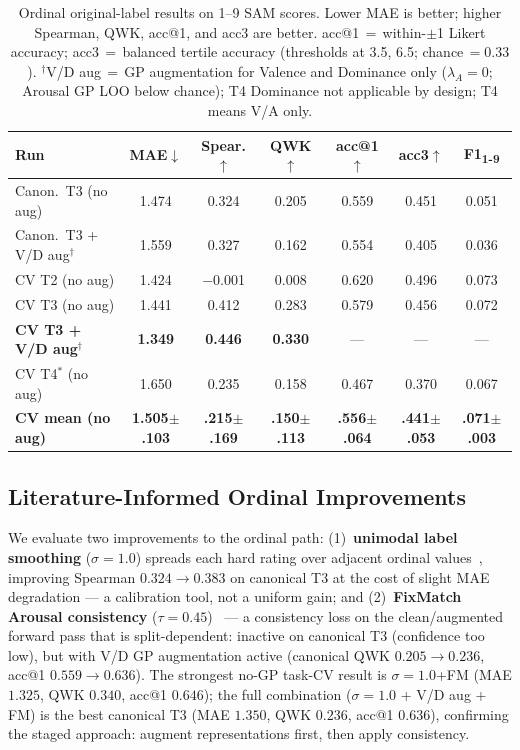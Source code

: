 \documentclass[sigconf,nonacm]{acmart}
\begin{document}
\begin{table}[t]
\caption{Ordinal original-label results on 1--9 SAM scores.  Lower MAE is
better; higher Spearman, QWK, acc@1, and acc3 are better.
acc@1\,$=$\,within-$\pm$1 Likert accuracy; acc3\,$=$\,balanced tertile accuracy
(thresholds at 3.5, 6.5; chance\,$=0.33$).
$^\dagger$V/D aug\,$=$\,GP augmentation for Valence and Dominance only
($\lambda_A{=}0$; Arousal GP LOO below chance);
T4 Dominance not applicable by design; T4 means V/A only.}
\label{tab:ordinal}
\centering
\setlength{\tabcolsep}{6pt}
\small
\begin{tabular}{lcccccc}
\toprule
\textbf{Run} & \textbf{MAE}$\downarrow$ & \textbf{Spear.}$\uparrow$ &
\textbf{QWK}$\uparrow$ & \textbf{acc@1}$\uparrow$ & \textbf{acc3}$\uparrow$ &
\textbf{F1\textsubscript{1-9}} \\
\midrule
Canon.\ T3 (no aug) & 1.474 & 0.324 & 0.205 & 0.559 & 0.451 & 0.051 \\
Canon.\ T3 + V/D aug$^\dagger$ & 1.559 & 0.327 & 0.162 & 0.554 & 0.405 & 0.036 \\
\midrule
CV T2 (no aug)   & 1.424 & $-$0.001 & 0.008 & 0.620 & 0.496 & 0.073 \\
CV T3 (no aug)   & 1.441 & 0.412  & 0.283 & 0.579 & 0.456 & 0.072 \\
\textbf{CV T3 + V/D aug}$^\dagger$ & \textbf{1.349} & \textbf{0.446} & \textbf{0.330} & --- & --- & --- \\
CV T4$^*$ (no aug) & 1.650 & 0.235 & 0.158 & 0.467 & 0.370 & 0.067 \\
\textbf{CV mean (no aug)} & \textbf{1.505$\pm$.103} &
\textbf{.215$\pm$.169} & \textbf{.150$\pm$.113} &
\textbf{.556$\pm$.064} & \textbf{.441$\pm$.053} &
\textbf{.071$\pm$.003} \\
\bottomrule
\end{tabular}
\end{table}

\subsection{Literature-Informed Ordinal Improvements}
\label{sec:ordinal_improvements}

We evaluate two improvements to the ordinal path:
(1)~\textbf{unimodal label smoothing} ($\sigma{=}1.0$) spreads each hard
rating over adjacent ordinal values~\cite{wen2023ordinal}, improving
Spearman $0.324\to0.383$ on canonical T3 at the cost of slight MAE
degradation --- a calibration tool, not a uniform gain; and
(2)~\textbf{FixMatch Arousal consistency} ($\tau{=}0.45$)~\cite{sohn2020fixmatch}
--- a consistency loss on the clean/augmented forward pass that is
split-dependent: inactive on canonical T3 (confidence too low), but with
V/D GP augmentation active (canonical QWK $0.205\to0.236$, acc@1 $0.559\to0.636$).
The strongest no-GP task-CV result is $\sigma{=}1.0$+FM
(MAE $1.325$, QWK $0.340$, acc@1 $0.646$); the full combination
($\sigma{=}1.0$ + V/D aug + FM) is the best canonical T3
(MAE $1.350$, QWK $0.236$, acc@1 $0.636$), confirming the staged
approach: augment representations first, then apply consistency.
\end{document}
